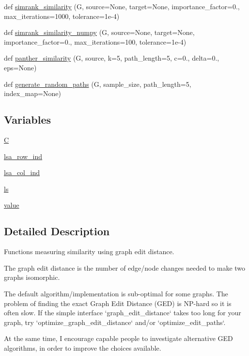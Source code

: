 \begin{DoxyCompactItemize}
\item 
def \hyperlink{namespacenetworkx_1_1algorithms_1_1similarity_a3ab3e57878c9ac3f9b4bb761079276e1}{simrank\+\_\+similarity} (G, source=None, target=None, importance\+\_\+factor=0., max\+\_\+iterations=1000, tolerance=1e-\/4)
\item 
def \hyperlink{namespacenetworkx_1_1algorithms_1_1similarity_a60b65f73b755236d64f0fa6e2006f310}{simrank\+\_\+similarity\+\_\+numpy} (G, source=None, target=None, importance\+\_\+factor=0., max\+\_\+iterations=100, tolerance=1e-\/4)
\item 
def \hyperlink{namespacenetworkx_1_1algorithms_1_1similarity_a3048856cdc525be8a48d87b458e16a14}{panther\+\_\+similarity} (G, source, k=5, path\+\_\+length=5, c=0., delta=0., eps=None)
\item 
def \hyperlink{namespacenetworkx_1_1algorithms_1_1similarity_aa014fc0b0861d475e18f287838625f41}{generate\+\_\+random\+\_\+paths} (G, sample\+\_\+size, path\+\_\+length=5, index\+\_\+map=None)
\end{DoxyCompactItemize}
\subsection*{Variables}
\begin{DoxyCompactItemize}
\item 
\hyperlink{namespacenetworkx_1_1algorithms_1_1similarity_af8f89640fd73be251fc4c663d33ec18e}{C}
\item 
\hyperlink{namespacenetworkx_1_1algorithms_1_1similarity_a55d767953a48a5084aa61a5476467268}{lsa\+\_\+row\+\_\+ind}
\item 
\hyperlink{namespacenetworkx_1_1algorithms_1_1similarity_a4aa2ee80a261aded9e24222f90d81658}{lsa\+\_\+col\+\_\+ind}
\item 
\hyperlink{namespacenetworkx_1_1algorithms_1_1similarity_ad3e4352e1974ac4cab904c376f999c6b}{ls}
\item 
\hyperlink{namespacenetworkx_1_1algorithms_1_1similarity_a9a6b624064a8d878701909b6ae7a8d9c}{value}
\end{DoxyCompactItemize}


\subsection{Detailed Description}
\begin{DoxyVerb}Functions measuring similarity using graph edit distance.

The graph edit distance is the number of edge/node changes needed
to make two graphs isomorphic.

The default algorithm/implementation is sub-optimal for some graphs.
The problem of finding the exact Graph Edit Distance (GED) is NP-hard
so it is often slow. If the simple interface `graph_edit_distance`
takes too long for your graph, try `optimize_graph_edit_distance`
and/or `optimize_edit_paths`.

At the same time, I encourage capable people to investigate
alternative GED algorithms, in order to improve the choices available.
\end{DoxyVerb}
 

